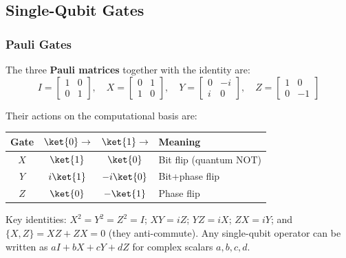 \documentclass[oneside]{academica}
\begin{document}
\subsection{Single-Qubit Gates}

\subsubsection{Pauli Gates}

The three \textbf{Pauli matrices} together with the identity are:
\begin{equation*}
  I=\begin{bmatrix}1&0\\0&1\end{bmatrix},\quad
  X=\begin{bmatrix}0&1\\1&0\end{bmatrix},\quad
  Y=\begin{bmatrix}0&-i\\i&0\end{bmatrix},\quad
  Z=\begin{bmatrix}1&0\\0&-1\end{bmatrix}
\end{equation*}

Their actions on the computational basis are:
\begin{center}
  \renewcommand{\arraystretch}{1.3}
  \begin{tabular}{c|c|c|l}
    \textbf{Gate} & $\ket{0}\to$ & $\ket{1}\to$ & \textbf{Meaning} \\
    \hline
    $X$ & $\ket{1}$ & $\ket{0}$ & Bit flip (quantum NOT) \\
    $Y$ & $i\ket{1}$ & $-i\ket{0}$ & Bit+phase flip \\
    $Z$ & $\ket{0}$ & $-\ket{1}$ & Phase flip \\
  \end{tabular}
\end{center}

Key identities: $X^2=Y^2=Z^2=I$; $XY=iZ$; $YZ=iX$; $ZX=iY$; and $\{X,Z\}=XZ+ZX=0$ (they anti-commute).
Any single-qubit operator can be written as $aI+bX+cY+dZ$ for complex scalars $a,b,c,d$.
\end{document}
